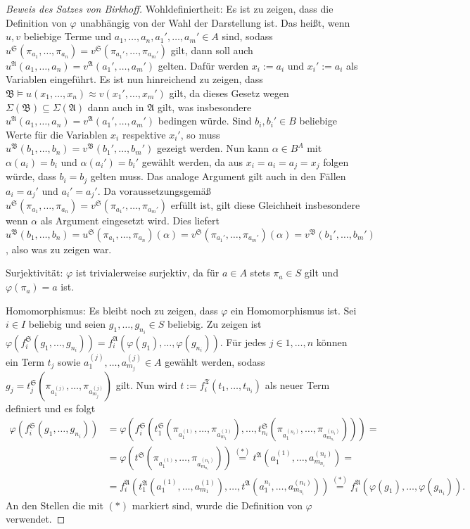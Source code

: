 \begin{proof}[Beweis des Satzes von Birkhoff]
    Wohldefiniertheit: Es ist zu zeigen, dass die Definition von $\varphi$ unabhängig von der Wahl der Darstellung ist.
    Das heißt, wenn $u,v$ beliebige Terme und $a_1,\ldots,a_n,a_1',\ldots,a_m'\in A$ sind, sodass $u^\mathfrak{S}(\pi_{a_1},\ldots,\pi_{a_n})=v^\mathfrak{S}(\pi_{a_1'},\ldots,\pi_{a_m'})$ gilt,
    dann soll auch $u^\mathfrak{A}(a_1,\ldots,a_n)=v^\mathfrak{A}(a_1',\ldots,a_m')$ gelten.
    Dafür werden $x_i:=a_i$ und $x_i':=a_i$ als Variablen eingeführt. Es ist nun hinreichend zu zeigen, dass
    $\mathfrak{B}\models u(x_1,\ldots,x_n)\approx v(x_1',\ldots,x_m')$ gilt, da dieses Gesetz wegen $\Sigma(\mathfrak{B})\subseteq \Sigma(\mathfrak{A})$
    dann auch in $\mathfrak{A}$ gilt, was insbesondere $u^\mathfrak{A}(a_1,\ldots,a_n)=v^\mathfrak{A}(a_1',\ldots,a_m')$ bedingen würde.
    Sind $b_i,b_i'\in B$ beliebige Werte für die Variablen $x_i$ respektive $x_i'$, so muss $u^\mathfrak{B}(b_1,\ldots,b_n)=v^\mathfrak{B}(b_1',\ldots,b_m')$
    gezeigt werden. Nun kann $\alpha\in B^A$ mit $\alpha(a_i)=b_i$ und $\alpha(a_i')=b_i'$ gewählt werden,
    da aus $x_i=a_i=a_j=x_j$ folgen würde, dass $b_i=b_j$ gelten muss. Das analoge Argument gilt auch in den Fällen
    $a_i=a_j'$ und $a_i'=a_j'$. Da voraussetzungsgemäß $u^\mathfrak{S}(\pi_{a_1},\ldots,\pi_{a_n})=v^\mathfrak{S}(\pi_{a_1'},\ldots,\pi_{a_m'})$ erfüllt ist,
    gilt diese Gleichheit insbesondere wenn $\alpha$ als Argument eingesetzt wird. Dies liefert
    $u^\mathfrak{B}(b_1,\ldots,b_n)=u^\mathfrak{S}(\pi_{a_1},\ldots,\pi_{a_n})(\alpha)=v^\mathfrak{S}(\pi_{a_1'},\ldots,\pi_{a_m'})(\alpha)=v^\mathfrak{B}(b_1',\ldots,b_m')$,
    also was zu zeigen war.

    Surjektivität: $\varphi$ ist trivialerweise surjektiv, da für $a\in A$ stets $\pi_a\in S$ gilt und $\varphi(\pi_a)=a$ ist.

    Homomorphismus: Es bleibt noch zu zeigen, dass $\varphi$ ein Homomorphismus ist.
    Sei $i\in I$ beliebig und seien $g_1,\ldots,g_{n_i}\in S$ beliebig. Zu zeigen ist $\varphi(f^\mathfrak{S}_i(g_1,\ldots,g_{n_i}))=f^\mathfrak{A}_i(\varphi(g_1),\ldots,\varphi(g_{n_i}))$.
    Für jedes $j\in 1,\ldots,n$ können ein Term $t_j$ sowie $a_1^{(j)},\ldots,a_{m_j}^{(j)}\in A$ gewählt werden,
    sodass $g_j=t^\mathfrak{S}_j(\pi_{a_1^{(j)}},\ldots,\pi_{a_{m_j}^{(j)}})$ gilt. Nun wird $t:=f^\mathfrak{T}_i(t_1,\ldots,t_{n_i})$ als neuer Term definiert und es folgt
    \begin{align*}
        \varphi(f^\mathfrak{S}_i(g_1,\ldots,g_{n_i}))&=\varphi(f^\mathfrak{S}_i(t^\mathfrak{S}_1(\pi_{a_1^{(1)}},\ldots,\pi_{a_{m_1}^{(1)}}),\ldots,t^\mathfrak{S}_{n_i}(\pi_{a_1^{(n_i)}},\ldots,\pi_{a_{m_{n_i}}^{(n_i)}})))=\\
        &=\varphi(t^\mathfrak{S}(\pi_{a_1^{(1)}},\ldots,\pi_{a_{m_{n_i}}^{(n_i)}}))\stackrel{(*)}{=}t^\mathfrak{A}(a_1^{(1)},\ldots,a_{m_{n_i}}^{(n_i)})=\\
        &=f^\mathfrak{A}_i(t^\mathfrak{A}_1(a_1^{(1)},\ldots,a_{m_1}^{(1)}),\ldots,t^\mathfrak{A}(a_1^{n_i},\ldots,a_{m_{n_i}}^{(n_i)}))\stackrel{(*)}{=}f^\mathfrak{A}_i(\varphi(g_1),\ldots,\varphi(g_{n_i})).
    \end{align*}
    An den Stellen die mit $(*)$ markiert sind, wurde die Definition von $\varphi$ verwendet.


\end{proof}
